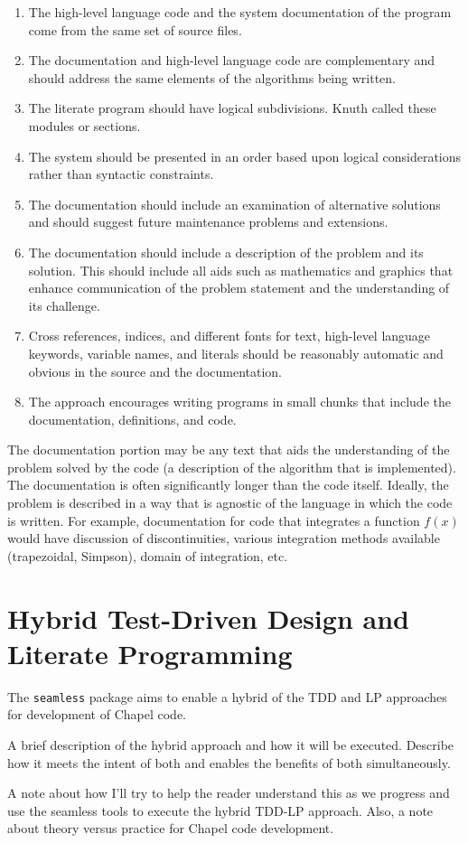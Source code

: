 \begin{enumerate}
\item The high-level language code and the system documentation of the program come from the same 
set of source files.
\item The documentation and high-level language code are complementary and should address the same 
elements of the algorithms being written.
\item The literate program should have logical subdivisions. Knuth called these modules or sections.
\item The system should be presented in an order based upon logical considerations rather than 
syntactic constraints.
\item The documentation should include an examination of alternative solutions and should suggest 
future maintenance problems and extensions.
\item The documentation should include a description of the problem and its solution. This should 
include all aids such as mathematics and graphics that enhance communication of the problem statement 
and the understanding of its challenge.
\item Cross references, indices, and different fonts for text, high-level language keywords, 
variable names, and literals should be reasonably automatic and obvious in the source and the documentation.
\item The approach encourages writing programs in small chunks that include the documentation, 
definitions, and code.
\end{enumerate}

The documentation portion may be any text that aids the understanding of the problem solved by the code 
(\eg a description of the algorithm that is implemented).  The documentation is often significantly 
longer than the code itself. Ideally, the problem is described in a way that is agnostic of the language
in which the code is written.  For example, documentation for code that integrates a function $f(x)$ would
have discussion of discontinuities, various integration methods available (\eg trapezoidal, Simpson), 
domain of integration, etc. 

\section{Hybrid Test-Driven Design and Literate Programming}
The \lstinline{seamless} package aims to enable a hybrid of the TDD and LP approaches for development
of Chapel code.

\begin{TODO}
A brief description of the hybrid approach and how it will be executed. Describe how it meets the intent of
both and enables the benefits of both simultaneously.
\end{TODO}

\begin{TODO}
A note about how I'll try to help the reader understand this as we progress and use the seamless
tools to execute the hybrid TDD-LP approach. Also, a note about theory versus practice for Chapel 
code development.
\end{TODO}
